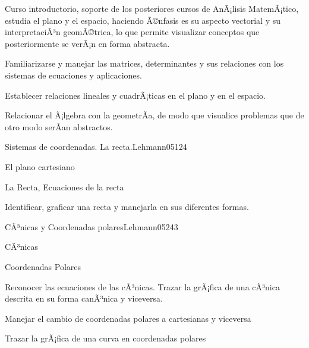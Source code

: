 \begin{syllabus}


\begin{justification}
Curso introductorio, soporte de los posteriores cursos de AnÃ¡lisis MatemÃ¡tico, 
estudia el plano y el espacio, haciendo Ã©nfasis es su aspecto vectorial y su interpretaciÃ³n geomÃ©trica, 
lo que permite visualizar conceptos que posteriormente se verÃ¡n en forma abstracta.
\end{justification}

\begin{goals}
\item Familiarizarse y manejar las matrices, determinantes y sus relaciones con los sistemas de ecuaciones y aplicaciones.
\item Establecer relaciones lineales y cuadrÃ¡ticas en el plano y en el espacio.
\item Relacionar el Ã¡lgebra con la geometrÃ­a, de modo que visualice problemas que de otro modo serÃ­an abstractos.
\end{goals}

\begin{outcomes}
\end{outcomes}

\begin{unit}{Sistemas de coordenadas. La recta.}{Lehmann05}{12}{4}
   \begin{topics}
      \item El plano cartesiano
      \item La Recta, Ecuaciones de la recta
   \end{topics}
   \begin{unitgoals}
      \item Identificar, graficar una recta y manejarla en sus diferentes formas.
   \end{unitgoals}
\end{unit}

\begin{unit}{CÃ³nicas y Coordenadas polares}{Lehmann05}{24}{3}
   \begin{topics}
      \item CÃ³nicas
      \item Coordenadas Polares
   \end{topics}

   \begin{unitgoals}
      \item Reconocer las ecuaciones de las cÃ³nicas. Trazar la grÃ¡fica de una cÃ³nica descrita en su forma canÃ³nica y viceversa.
      \item Manejar el cambio de coordenadas polares a cartesianas y viceversa
      \item Trazar la grÃ¡fica de una curva en coordenadas polares
      \end{unitgoals}
\end{unit}


\end{syllabus}
